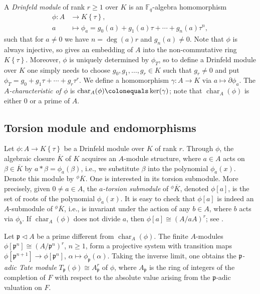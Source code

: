 \documentclass[12pt]{amsart}
\theoremstyle{definition}
\theoremstyle{remark}
\numberwithin{equation}{section}
\numberwithin{thm}{section}
\DeclareMathOperator{\chr}{char}
\newcommand{\fp}{\mathfrak{p}}
\newcommand{\F}{\mathbb{F}}
\newcommand{\To}{\longrightarrow}
\newcommand{\oK}{\overline{K}}
\newcommand{\twist}[1]{#1\!\left\{\tau\right\}}
\begin{document}
A \textit{Drinfeld module} of rank $r\geq 1$ over $K$ is an $\F_q$-algebra homomorphism 
\begin{align*}
	\phi\colon A &\To \twist{K}, \\ 
	a &\longmapsto \phi_a=g_0(a)+g_1(a)\tau+\cdots +g_n(a)\tau^n,
\end{align*}
such that for $a\neq 0$ we have $n=\deg(a) r$ and $g_n(a)\neq 0$. Note that $\phi$ is always injective, so gives an embedding of $A$ 
into the non-commutative ring $\twist{K}$. Moreover, $\phi$ is uniquely determined by $\phi_T$, so to define a Drinfeld module over $K$ 
one simply needs to choose $g_0, g_1, \dots, g_r\in K$ such that $g_r\neq 0$ and put $\phi_T=g_0+g_1\tau+\cdots+g_r\tau^r$. 
We define a homomorphism $\gamma\colon A\to K$ via $a\mapsto \partial \phi_a$. The \textit{$A$-characteristic of $\phi$} is 
$\chr_A(\phi)\colonequals \ker(\gamma)$; note that $\chr_A(\phi)$ is either $0$ or a prime of $A$. 

\subsection{Torsion module and endomorphisms}\label{secTM} 
Let $\phi\colon A\to \twist{K}$ be a Drinfeld module over $K$ of rank $r$. Through $\phi$, the algebraic closure $\oK$ of $K$ acquires an $A$-module structure, where $a\in A$ acts on $\beta\in \oK$ by $a\ast \beta=\phi_a(\beta)$, i.e., we substitute $\beta$ into the 
polynomial $\phi_a(x)$. Denote this module by ${^\phi}{\oK}$. One is interested in its torsion submodule. More precisely, given $0\neq a\in A$, 
the \textit{$a$-torsion submodule} of ${^\phi}{\oK}$, denoted $\phi[a]$,  is the set of roots of the polynomial $\phi_a(x)$. It is easy to check that $\phi[a]$ 
is indeed an $A$-submodule of ${^\phi}{\oK}$, i.e., is invariant under the action of any $b\in A$, where $b$ acts via $\phi_b$. 
If $\chr_A(\phi)$ does not divide $a$, then $\phi[a]\cong (A/aA)^r$; see \cite[Cor. 3.5.3]{PapikianGTM}. 

Let $\fp\lhd A$ be a prime different from $\chr_A(\phi)$. The finite $A$-modules $\phi[\fp^n]\cong (A/\fp^n)^r$, $n\geq 1$, form a projective system 
with transition maps $\phi[\fp^{n+1}]\to \phi[\fp^n]$, $\alpha\mapsto \phi_\fp(\alpha)$. Taking the inverse limit, one obtains the \textit{$\fp$-adic Tate module} 
$T_\fp(\phi)\cong A_\fp^r$ of $\phi$, where $A_\fp$ is the ring of integers of the completion of $F$ with respect to the absolute value arising from the $\fp$-adic valuation on $F$. 
\end{document}
